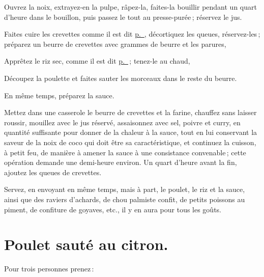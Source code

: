 Ouvrez la noix, extrayez-en la pulpe, râpez-la, faites-la bouillir pendant un quart
d'heure dans le bouillon, puis passez le tout au presse-purée ; réservez le jus.

Faites cuire les crevettes comme il est dit
\hyperlink{p0287}{p. \pageref{pg0287}}, décortiquez les queues, réservez-les ;
préparez un beurre de crevettes avec {\mmm} grammes de beurre et les
parures,

Apprêtez le riz sec, comme il est dit \hyperlink{p0707}{p. \pageref{pg0707}} ;
tenez-le au chaud,

Découpez la poulette et faites sauter les morceaux dans le reste du beurre.

En même temps, préparez la sauce.

Mettez dans une casserole le beurre de crevettes et la farine, chauffez sans
laisser roussir, mouillez avec le jus réservé, assaisonnez avec sel, poivre et
curry, en quantité suffisante pour donner de la chaleur à la sauce, tout en lui
conservant la saveur de la noix de coco qui doit être sa caractéristique, et
continuez la cuisson, à petit feu, de manière à amener la sauce à une
consistance convenable ; cette opération demande une demi-heure environ. Un
quart d'heure avant la fin, ajoutez les queues de crevettes.

Servez, en envoyant en même temps, mais à part, le poulet, le riz et la sauce,
ainsi que des raviers d'achards, de chou palmiste confit, de petits poissons au
piment, de confiture de goyaves, etc., il y en aura pour tous les goûts.

\section*{\centering Poulet sauté au citron.}
{}

Pour trois personnes prenez :

\medskip

